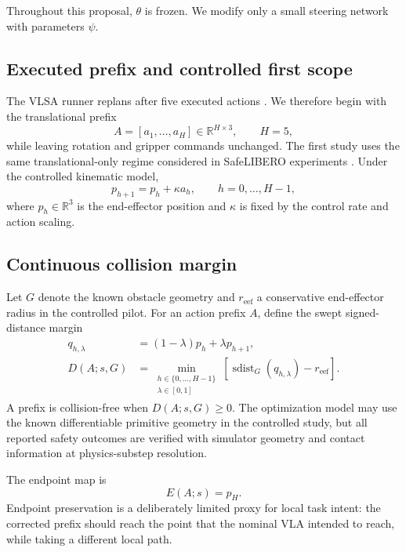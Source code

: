 \documentclass[10pt,conference]{IEEEtran}
\newcommand{\R}{\mathbb{R}}
\newcommand{\1}{\mathbf{1}}
\newcommand{\sdist}{\operatorname{sdist}}
\begin{document}
Throughout this proposal, $\theta$ is frozen. We modify only a small steering network with parameters $\psi$.

\subsection{Executed prefix and controlled first scope}

The VLSA runner replans after five executed actions \cite{vlsarepo}. We therefore begin with the translational prefix
\begin{equation}
    A = [a_1,\ldots,a_H]\in\R^{H\times 3},
    \qquad H=5,
\end{equation}
while leaving rotation and gripper commands unchanged. The first study uses the same translational-only regime considered in SafeLIBERO experiments \cite{hu2025vlsa}. Under the controlled kinematic model,
\begin{equation}
    p_{h+1}=p_h+\kappa a_h,
    \qquad h=0,\ldots,H-1,
    \label{eq:kinematics}
\end{equation}
where $p_h\in\R^3$ is the end-effector position and $\kappa$ is fixed by the control rate and action scaling.

\subsection{Continuous collision margin}

Let $G$ denote the known obstacle geometry and $r_{\mathrm{eef}}$ a conservative end-effector radius in the controlled pilot. For an action prefix $A$, define the swept signed-distance margin
\begin{equation}
\begin{aligned}
q_{h,\lambda} &= (1-\lambda)p_h+\lambda p_{h+1},\\
D(A;s,G) &=
\min_{\substack{h\in\{0,\ldots,H-1\}\\\lambda\in[0,1]}}
\left[\sdist_G(q_{h,\lambda})-r_{\mathrm{eef}}\right].
\end{aligned}
\label{eq:clearance}
\end{equation}
A prefix is collision-free when $D(A;s,G)\geq 0$. The optimization model may use the known differentiable primitive geometry in the controlled study, but all reported safety outcomes are verified with simulator geometry and contact information at physics-substep resolution.

The endpoint map is
\begin{equation}
    E(A;s)=p_H.
    \label{eq:endpoint}
\end{equation}
Endpoint preservation is a deliberately limited proxy for local task intent: the corrected prefix should reach the point that the nominal VLA intended to reach, while taking a different local path.
\end{document}
